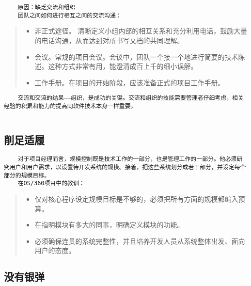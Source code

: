 \documentclass[11pt]{article}
\providecommand{\tightlist}{%
      \setlength{\itemsep}{0pt}\setlength{\parskip}{0pt}}
\begin{document}
\begin{verbatim}
    原因：缺乏交流和组织
    团队之间如何进行相互之间的交流沟通： 
\end{verbatim}

\begin{quote}
\begin{itemize}
\tightlist
\item
  非正式途径。
  清晰定义小组内部的相互关系和充分利用电话，鼓励大量的电话沟通，从而达到对所书写文档的共同理解。
\item
  会议。常规的项目会议。会议中，团队一个接一个地进行简要的技术陈述。这种方式非常有用，能澄清成百上千的细小误解。
\item
  工作手册。在项目的开始阶段，应该准备正式的项目工作手册。
\end{itemize}
\end{quote}

\begin{verbatim}
    交流和交流的结果——组织，是成功的关键。交流和组织的技能需要管理者仔细考虑，相关经验的积累和能力的提高同软件技术本身一样重要。
    
\end{verbatim}

\hypertarget{ux524aux8db3ux9002ux5c65}{%
\subsection{削足适履}\label{ux524aux8db3ux9002ux5c65}}

\begin{verbatim}
    对于项目经理而言，规模控制既是技术工作的一部分，也是管理工作的一部分。他必须研究用户和用户需求，以设置待开发系统的规模。接着，把这些系统划分成若干部分，并设定每个部分的规模目标。
    在OS/360项目中的教训：  
\end{verbatim}

\begin{quote}
\begin{itemize}
\tightlist
\item
  仅对核心程序设定规模目标是不够的，必须把所有方面的规模都编入预算。\\
\item
  在指明模块有多大的同事，明确定义模块的功能。\\
\item
  必须确保连贯的系统完整性，并且培养开发人员从系统整体出发、面向用户的态度。
\end{itemize}
\end{quote}

\hypertarget{ux6ca1ux6709ux94f6ux5f39}{%
\subsection{没有银弹}\label{ux6ca1ux6709ux94f6ux5f39}}
\end{document}
